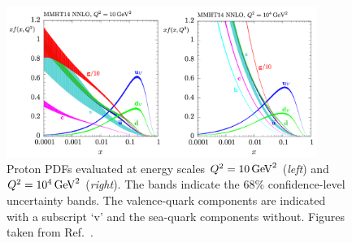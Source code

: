 \begin{figure}
    \begin{center}
        \includegraphics[width=0.9\textwidth]{figures/event_simulation/pdfs_lhc}
        \caption{
            Proton PDFs evaluated at energy scales $Q^2 = 10\,\text{Ge\kern -0.1em V}^2$ (\textit{left}) and $Q^2 = 10^4\,\text{Ge\kern -0.1em V}^2$ (\textit{right}).
            The bands indicate the 68\% confidence-level uncertainty bands.
            The valence-quark components are indicated with a subscript `v' and the sea-quark components without.
            Figures taken from Ref.~\cite{Harland-Lang:2014zoa}.
        }
        \label{fig:pdfs_lhc}
    \end{center}
\end{figure}

